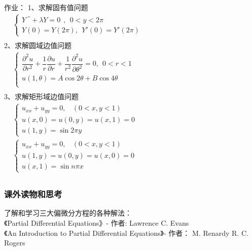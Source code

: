 \begin{frame}	
	作业：
	1、求解固有值问题\\ 
	$\begin{array}{lllllllll}
		& \begin{cases}
			Y~^{''} +\lambda Y=0  ~~,~~ 0<y<2\pi \\
			Y(0) =Y(2\pi) , ~~ Y'(0) =Y'(2\pi)
		\end{cases}\\	
	\end{array}$ \\ 
	2、求解圆域边值问题\\
	$\displaystyle  \begin{array}{lllllllll}
	&\begin{cases}
		\dfrac{\partial^2 u }{\partial r^2 } +\dfrac{1}{r } \dfrac{\partial u }{\partial r } +
		\dfrac{1}{r^2 } \dfrac{\partial ^2 u }{\partial \theta ^2  } =0, ~~ 0<r<1\\
		u(1,\theta)= A\cos 2 \theta +B \cos 4 \theta \\	
	\end{cases} \\	
	\end{array}$ \\ 
	3、求解矩形域边值问题\\
	$\begin{array}{lllllllll}
		& \begin{cases}
			u_{xx} +u_{yy} =0 ,~~~~ (0<x, y<1)\\
			u(x,0)= u(0,y)=u(x,1)= 0 \\
			u(1,y)= \sin 2\pi y
		\end{cases}\\	
		&\begin{cases}
			u_{xx} +u_{yy} =0 ,~~~~ (0<x, y<1)\\
			u(1,y)= u(0,y)=u(x,0)= 0 \\
			u(x,1)= \sin n\pi x
		\end{cases} \\	
	\end{array}$ \\ 	
\end{frame}

\begin{frame}
	\frametitle{课外读物和思考}
	了解和学习三大偏微分方程的各种解法：\\
	《Partial Differential Equations》- 作者: Lawrence C. Evans \\
	《An Introduction to Partial Differential Equations》- 作者： M. Renardy R. C. Rogers
\end{frame}
